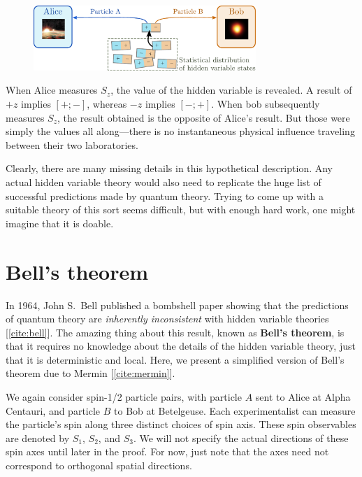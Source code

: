\documentclass[pra,12pt]{revtex4}
\begin{document}
\begin{figure}[h]
  \centering\includegraphics[width=0.75\textwidth]{hiddenvariables}
\end{figure}

When Alice measures $S_z$, the value of the hidden variable is
revealed.  A result of $+z$ implies $[+;-]$, whereas $-z$ implies
$[-;+]$.  When bob subsequently measures $S_z$, the result obtained is
the opposite of Alice's result.  But those were simply the values all
along---there is no instantaneous physical influence traveling between
their two laboratories.

Clearly, there are many missing details in this hypothetical
description.  Any actual hidden variable theory would also need to
replicate the huge list of successful predictions made by quantum
theory.  Trying to come up with a suitable theory of this sort seems
difficult, but with enough hard work, one might imagine that it is
doable.

\section{Bell's theorem}
\label{sec:bell}

In 1964, John S.~Bell published a bombshell paper showing that the
predictions of quantum theory are \textit{inherently inconsistent}
with hidden variable theories [\ref{cite:bell}].  The amazing thing
about this result, known as \textbf{Bell's theorem}, is that it
requires no knowledge about the details of the hidden variable theory,
just that it is deterministic and local.  Here, we present a
simplified version of Bell's theorem due to Mermin
[\ref{cite:mermin}].

We again consider spin-1/2 particle pairs, with particle $A$ sent to
Alice at Alpha Centauri, and particle $B$ to Bob at Betelgeuse.  Each
experimentalist can measure the particle's spin along three distinct
choices of spin axis.  These spin observables are denoted by $S_1$,
$S_2$, and $S_3$.  We will not specify the actual directions of these
spin axes until later in the proof.  For now, just note that the axes
need not correspond to orthogonal spatial directions.
\end{document}
